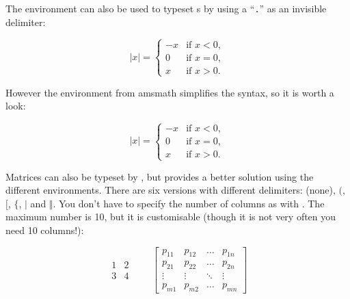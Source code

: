 The  environment can also be used to typeset s by
using a ``\verb|.|'' as an invisible  delimiter:
\begin{example}
\begin{equation*}
  |x| = \left\{
    \begin{array}{rl}
      -x & \text{if } x < 0,\\
      0 & \text{if } x = 0,\\
      x & \text{if } x > 0.
    \end{array} \right.
\end{equation*}
\end{example}
However the  environment from \textsf{amsmath} simplifies
the syntax, so it is worth a look:
\begin{example}
  \begin{equation*}
    |x| = 
    \begin{cases}
      -x & \text{if } x < 0,\\
      0 & \text{if } x = 0,\\
      x & \text{if } x > 0.
    \end{cases} 
\end{equation*}
\end{example}


Matrices can also be typeset by , but
 provides a better solution using the different 
environments. There are six versions with different delimiters: 
(none),  $($,  $[$,  $\{$,  $\vert$ and
 $\Vert$. You don't have to specify the number of columns as with
. The maximum number is 10, but it is customisable (though it is not
very often you need 10 columns!):
\begin{example}
\begin{equation*}
  \begin{matrix} 
    1 & 2 \\
    3 & 4 
  \end{matrix} \qquad
  \begin{bmatrix} 
    p_{11} & p_{12} & \ldots 
    & p_{1n} \\
    p_{21} & p_{22} & \ldots 
    & p_{2n} \\
    \vdots & \vdots & \ddots 
    & \vdots \\
    p_{m1} & p_{m2} & \ldots 
    & p_{mn} 
  \end{bmatrix}
\end{equation*}
\end{example}



